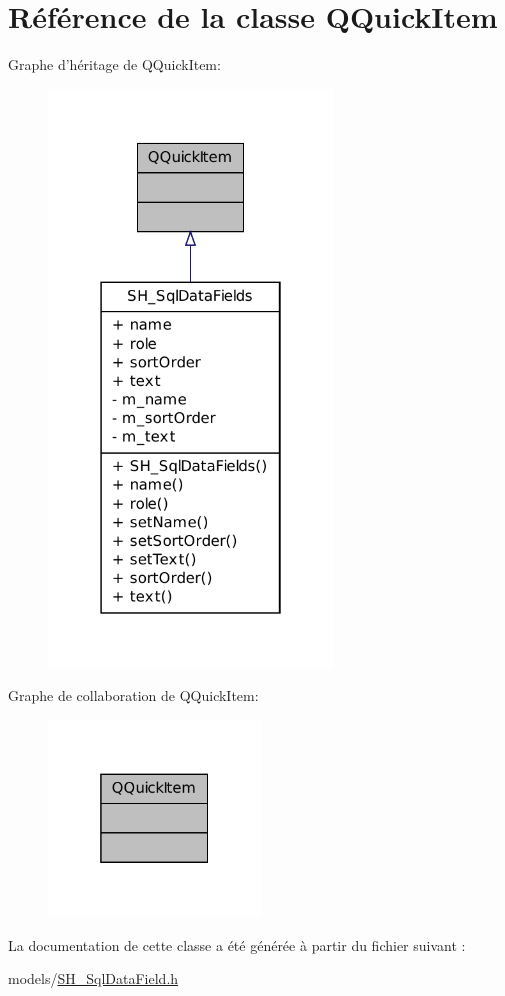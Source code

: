 \hypertarget{classQQuickItem}{\section{Référence de la classe Q\-Quick\-Item}
\label{classQQuickItem}
}


Graphe d'héritage de Q\-Quick\-Item\-:
\nopagebreak
\begin{figure}[H]
\begin{center}
\leavevmode
\includegraphics[width=214pt]{classQQuickItem__inherit__graph}
\end{center}
\end{figure}


Graphe de collaboration de Q\-Quick\-Item\-:
\nopagebreak
\begin{figure}[H]
\begin{center}
\leavevmode
\includegraphics[width=160pt]{classQQuickItem__coll__graph}
\end{center}
\end{figure}


La documentation de cette classe a été générée à partir du fichier suivant \-:\begin{DoxyCompactItemize}
\item 
models/\hyperlink{SH__SqlDataField_8h}{S\-H\-\_\-\-Sql\-Data\-Field.\-h}\end{DoxyCompactItemize}
